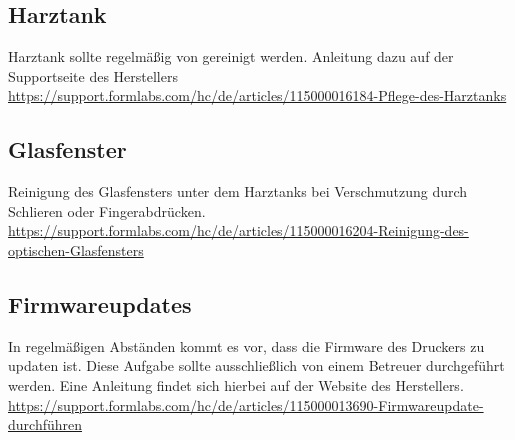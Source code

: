 \documentclass{\basedir/fablab-document}
\begin{document}
	\subsection{Harztank}
		Harztank sollte regelmäßig von gereinigt werden. Anleitung dazu auf der Supportseite des Herstellers\\
		\url{https://support.formlabs.com/hc/de/articles/115000016184-Pflege-des-Harztanks}
		
		\subsection{Glasfenster}
		Reinigung des Glasfensters unter dem Harztanks bei Verschmutzung durch Schlieren oder Fingerabdrücken.\\ \url{https://support.formlabs.com/hc/de/articles/115000016204-Reinigung-des-optischen-Glasfensters}
	
	\subsection{Firmwareupdates}
	
In regelmäßigen Abständen kommt es vor, dass die Firmware des Druckers zu updaten ist. Diese Aufgabe sollte ausschließlich von einem Betreuer durchgeführt werden. Eine Anleitung findet sich hierbei auf der Website des Herstellers.\\	
		\url{https://support.formlabs.com/hc/de/articles/115000013690-Firmwareupdate-durchführen}
	
\end{document}
